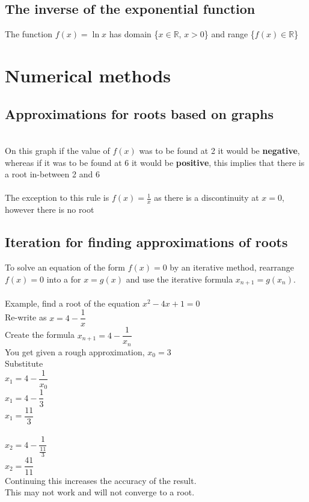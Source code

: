 \documentclass{article}[18pt]
\begin{document}
\subsection{The inverse of the exponential function}
The function $f(x)=\ln x$ has domain \{$x \in \mathbb{R}$, $x>0$\} and range \{$f(x) \in \mathbb{R}$\}
\newpage
\section{Numerical methods}
\subsection{Approximations for roots based on graphs}
\\
On this graph if the value of $f(x)$ was to be found at 2 it would be \textbf{negative}, whereas if it was to be found at 6 it would be \textbf{positive}, this implies that there is a root in-between 2 and 6\\
\\
The exception to this rule is $f(x)=\frac{1}{x}$ as there is a discontinuity at $x=0$, however there is no root
\subsection{Iteration for finding approximations of roots}
To solve an equation of the form $f(x)=0$ by an iterative method, rearrange $f(x)=0$ into a for $x=g(x)$ and use the iterative formula $x_{n+1}=g(x_n)$.\\
\\
Example, find a root of the equation $x^2-4x+1=0$\\
Re-write as $x=4-\dfrac{1}{x}$\\

Create the formula $x_{n+1}=4-\dfrac{1}{x_n}$\\
You get given a rough approximation, $x_0=3$\\
Substitute\\
$x_1=4-\dfrac{1}{x_0}$\\
$x_1=4-\dfrac{1}{3}$\\
$x_1=\dfrac{11}{3}$\\
\\
$x_2=4-\dfrac{1}{\frac{11}{3}}$\\
$x_2=\dfrac{41}{11}$\\
Continuing this increases the accuracy of the result.\\
This may not work and will not converge to a root.
\end{document}
